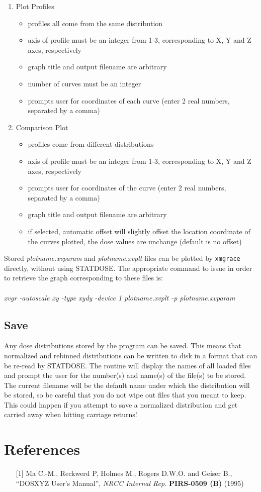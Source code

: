 \documentclass[12pt,twoside]{article}
\begin{document}
\begin{enumerate}
\item Plot Profiles
\begin{itemize}
\item profiles all come from the same distribution
\item axis of profile must be an integer from 1-3, corresponding to X, Y and Z axes, respectively
\item graph title and output filename are arbitrary
\item number of curves must be an integer
\item prompts user for coordinates of each curve (enter 2 real numbers, separated by a comma)
\end{itemize}
\item Comparison Plot
\begin{itemize}
\item profiles come from different distributions
\item axis of profile must be an integer from 1-3, corresponding to X, Y and Z axes, respectively
\item prompts user for coordinates of the curve (enter 2 real numbers, separated by a comma)
\item graph title and output filename are arbitrary
\item if selected, automatic offset will slightly offset the location coordinate of the curves plotted, the dose values are unchange (default is no offset)

\end{itemize}
\end{enumerate}

Stored {\em plotname.xvparam} and {\em plotname.xvplt} files can be plotted by
{\tt xmgrace}  directly, without using STATDOSE. The appropriate command to
issue in order to retrieve the graph corresponding to these files is:\\
~\\
{\em xvgr -autoscale xy -type xydy -device  1 plotname.xvplt  -p
plotname.xvparam}


\subsection{Save}
Any dose distributions stored by the program can be saved. This means that
normalized and rebinned distributions can be written to disk in a format
that can be re-read by STATDOSE. The routine will display the names of all
loaded files and prompt the user for the number(s) and name(s) of the
file(s) to be stored. The current filename will be the default name under
which the distribution will be stored, so be careful that you do not wipe
out files that you meant to keep. This could happen if you attempt to save
a normalized distribution and get carried away when hitting carriage
returns!

\section{References}

\begin{enumerate}
\item  [{[1]}] Ma C.-M., Reckwerd P, Holmes M., Rogers D.W.O. and Geiser B.,
``DOSXYZ User's Manual'', {\it NRCC Internal Rep.} {\bf PIRS-0509 (B)} (1995)
\end{enumerate}
\end{document}
